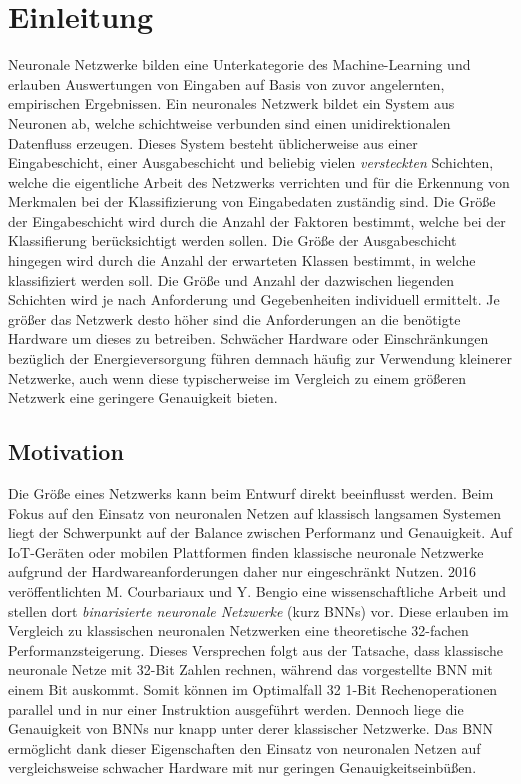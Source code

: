 \chapter{Einleitung}

Neuronale Netzwerke bilden eine Unterkategorie des Machine-Learning und erlauben
Auswertungen von Eingaben auf Basis von zuvor angelernten, empirischen
Ergebnissen.
Ein neuronales Netzwerk bildet ein System aus Neuronen ab, welche schichtweise
verbunden sind einen unidirektionalen Datenfluss erzeugen.
Dieses System besteht üblicherweise aus einer Eingabeschicht, einer
Ausgabeschicht und beliebig vielen \emph{versteckten} Schichten,
welche die eigentliche Arbeit des Netzwerks verrichten und für die Erkennung
von Merkmalen bei der Klassifizierung von Eingabedaten zuständig sind.
Die Größe der Eingabeschicht wird durch die Anzahl der Faktoren bestimmt,
welche bei der Klassifierung berücksichtigt werden sollen.
Die Größe der Ausgabeschicht hingegen wird durch die Anzahl der erwarteten
Klassen bestimmt, in welche klassifiziert werden soll.
Die Größe und Anzahl der dazwischen liegenden Schichten wird je
nach Anforderung und Gegebenheiten individuell ermittelt.
Je größer das Netzwerk desto höher sind die Anforderungen an die benötigte
Hardware um dieses zu betreiben. Schwächer Hardware oder
Einschränkungen bezüglich der Energieversorgung führen demnach häufig
zur Verwendung kleinerer Netzwerke, auch wenn diese typischerweise im Vergleich
zu einem größeren Netzwerk eine geringere Genauigkeit bieten.


\section{Motivation}

Die Größe eines Netzwerks kann beim Entwurf direkt beeinflusst werden.
Beim Fokus auf den Einsatz von neuronalen Netzen auf klassisch langsamen
Systemen liegt der Schwerpunkt auf der Balance zwischen Performanz und
Genauigkeit.
Auf IoT-Geräten oder mobilen Plattformen finden klassische neuronale Netzwerke
aufgrund der Hardwareanforderungen daher nur eingeschränkt Nutzen.
2016 veröffentlichten M. Courbariaux und Y. Bengio \cite{Courbariaux} eine
wissenschaftliche Arbeit und stellen dort
\emph{binarisierte neuronale Netzwerke} (kurz BNNs) vor.
Diese erlauben im Vergleich zu klassischen neuronalen Netzwerken eine
theoretische 32-fachen Performanzsteigerung. Dieses Versprechen folgt aus der
Tatsache, dass klassische neuronale Netze mit 32-Bit Zahlen rechnen, während
das vorgestellte BNN mit einem Bit auskommt. Somit können im Optimalfall 32
1-Bit Rechenoperationen parallel und in nur einer Instruktion ausgeführt werden.
Dennoch liege die Genauigkeit von BNNs nur knapp unter derer klassischer Netzwerke.
Das BNN ermöglicht dank dieser Eigenschaften den Einsatz von neuronalen Netzen
auf vergleichsweise schwacher Hardware mit nur geringen Genauigkeitseinbüßen.

